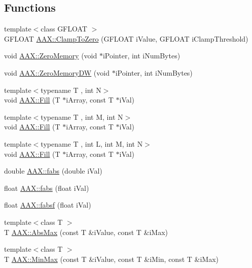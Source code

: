 \subsection*{Functions}
\begin{DoxyCompactItemize}
\item 
{\footnotesize template$<$class G\+F\+L\+O\+AT $>$ }\\G\+F\+L\+O\+AT \mbox{\hyperlink{a00852_a6b1f85f5d8c5837ff52212e13b84e6d0}{A\+A\+X\+::\+Clamp\+To\+Zero}} (G\+F\+L\+O\+AT i\+Value, G\+F\+L\+O\+AT i\+Clamp\+Threshold)
\item 
void \mbox{\hyperlink{a00852_ae9c9b3862c1b63dc4fb4e3c901d42935}{A\+A\+X\+::\+Zero\+Memory}} (void $\ast$i\+Pointer, int i\+Num\+Bytes)
\item 
void \mbox{\hyperlink{a00852_a0e598e79488a12354e9dbc340fa99b5a}{A\+A\+X\+::\+Zero\+Memory\+DW}} (void $\ast$i\+Pointer, int i\+Num\+Bytes)
\item 
{\footnotesize template$<$typename T , int N$>$ }\\void \mbox{\hyperlink{a00852_a1e72222769ecdf34fa73ae38c0c709df}{A\+A\+X\+::\+Fill}} (T $\ast$i\+Array, const T $\ast$i\+Val)
\item 
{\footnotesize template$<$typename T , int M, int N$>$ }\\void \mbox{\hyperlink{a00852_a480beff32ac0847c665f735fd8f78c0a}{A\+A\+X\+::\+Fill}} (T $\ast$i\+Array, const T $\ast$i\+Val)
\item 
{\footnotesize template$<$typename T , int L, int M, int N$>$ }\\void \mbox{\hyperlink{a00852_a114e6f06cf5789da4aad7ae0d786876e}{A\+A\+X\+::\+Fill}} (T $\ast$i\+Array, const T $\ast$i\+Val)
\item 
double \mbox{\hyperlink{a00852_aa4fa4d0765a764b020102cdbff8b45b0}{A\+A\+X\+::fabs}} (double i\+Val)
\item 
float \mbox{\hyperlink{a00852_af486dfb226661e4a47d7b42eca881759}{A\+A\+X\+::fabs}} (float i\+Val)
\item 
float \mbox{\hyperlink{a00852_a7fc4d4cd59850b8b875d085467ff5850}{A\+A\+X\+::fabsf}} (float i\+Val)
\item 
{\footnotesize template$<$class T $>$ }\\T \mbox{\hyperlink{a00852_aa4cbb7d8707ad89fc5ba5169ebb75201}{A\+A\+X\+::\+Abs\+Max}} (const T \&i\+Value, const T \&i\+Max)
\item 
{\footnotesize template$<$class T $>$ }\\T \mbox{\hyperlink{a00852_aca59c4cdf56130ee251118c02a9963e3}{A\+A\+X\+::\+Min\+Max}} (const T \&i\+Value, const T \&i\+Min, const T \&i\+Max)

\end{DoxyCompactItemize}
